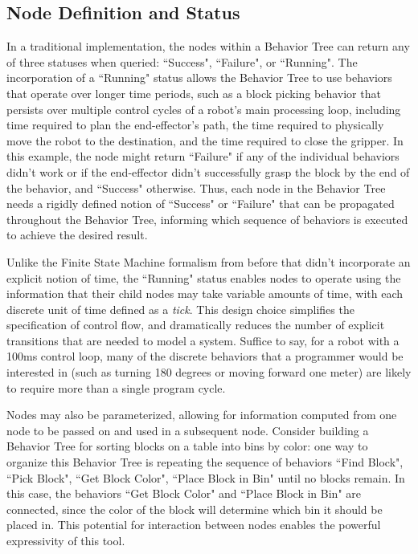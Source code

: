 \subsection{Node Definition and Status}
In a traditional implementation, the nodes within a Behavior Tree can return any of three statuses when queried: ``Success", ``Failure", or ``Running". The incorporation of a ``Running" status allows the Behavior Tree to use behaviors that operate over longer time periods, such as a block picking behavior that persists over multiple control cycles of a robot's main processing loop, including time required to plan the end-effector's path, the time required to physically move the robot to the destination, and the time required to close the gripper. In this example, the node might return ``Failure" if any of the individual behaviors didn't work or if the end-effector didn't successfully grasp the block by the end of the behavior, and ``Success" otherwise. Thus, each node in the Behavior Tree needs a rigidly defined notion of ``Success" or ``Failure" that can be propagated throughout the Behavior Tree, informing which sequence of behaviors is executed to achieve the desired result.

Unlike the Finite State Machine formalism from before that didn't incorporate an explicit notion of time, the ``Running" status enables nodes to operate using the information that their child nodes may take variable amounts of time, with each discrete unit of time defined as a \emph{tick}. This design choice simplifies the specification of control flow, and dramatically reduces the number of explicit transitions that are needed to model a system. Suffice to say, for a robot with a 100ms control loop, many of the discrete behaviors that a programmer would be interested in (such as turning 180 degrees or moving forward one meter) are likely to require more than a single program cycle. 

Nodes may also be parameterized, allowing for information computed from one node to be passed on and used in a subsequent node. Consider building a Behavior Tree for sorting blocks on a table into bins by color: one way to organize this Behavior Tree is repeating the sequence of behaviors ``Find Block", ``Pick Block", ``Get Block Color", ``Place Block in Bin" until no blocks remain. In this case, the behaviors ``Get Block Color" and ``Place Block in Bin" are connected, since the color of the block will determine which bin it should be placed in. This potential for interaction between nodes enables the powerful expressivity of this tool.

